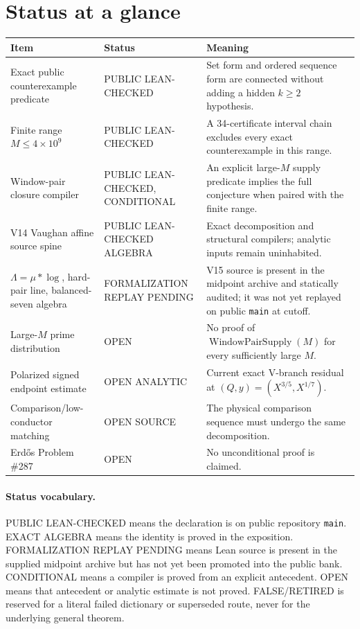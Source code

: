 \documentclass[11pt]{article}
\theoremstyle{definition}
\newcommand{\1}{\mathbf 1}
\newcommand{\WPS}{\operatorname{WindowPairSupply}}
\newcommand{\status}[1]{\textsf{#1}}
\begin{document}
\section*{Status at a glance}
\begin{center}
\renewcommand{\arraystretch}{1.22}
\begin{tabularx}{\textwidth}{>{\raggedright\arraybackslash}p{}
>{\raggedright\arraybackslash}p{}X}
\toprule
Item & Status & Meaning \\
\midrule
Exact public counterexample predicate & \status{PUBLIC LEAN-CHECKED} & Set form and ordered sequence form are connected without adding a hidden $k\ge2$ hypothesis. \\
Finite range $M\le4\times10^9$ & \status{PUBLIC LEAN-CHECKED} & A 34-certificate interval chain excludes every exact counterexample in this range. \\
Window-pair closure compiler & \status{PUBLIC LEAN-CHECKED, CONDITIONAL} & An explicit large-$M$ supply predicate implies the full conjecture when paired with the finite range. \\
V14 Vaughan affine source spine & \status{PUBLIC LEAN-CHECKED ALGEBRA} & Exact decomposition and structural compilers; analytic inputs remain uninhabited. \\
$\Lambda=\mu*\log$, hard-pair line, balanced-seven algebra & \status{FORMALIZATION REPLAY PENDING} & V15 source is present in the midpoint archive and statically audited; it was not yet replayed on public \texttt{main} at cutoff. \\
Large-$M$ prime distribution & \status{OPEN} & No proof of $\WPS(M)$ for every sufficiently large $M$. \\
Polarized signed endpoint estimate & \status{OPEN ANALYTIC} & Current exact V-branch residual at $(Q,y)=(X^{3/5},X^{1/7})$. \\
Comparison/low-conductor matching & \status{OPEN SOURCE} & The physical comparison sequence must undergo the same decomposition. \\
Erd\H{o}s Problem \#287 & \status{OPEN} & No unconditional proof is claimed. \\
\bottomrule
\end{tabularx}
\end{center}

\paragraph{Status vocabulary.}
\status{PUBLIC LEAN-CHECKED} means the declaration is on public repository
\texttt{main}.  \status{EXACT ALGEBRA} means the identity is proved in the exposition.
\status{FORMALIZATION REPLAY PENDING} means Lean source is present in the supplied midpoint
archive but has not yet been promoted into the public bank.  \status{CONDITIONAL} means a
compiler is proved from an explicit antecedent.  \status{OPEN} means that antecedent or
analytic estimate is not proved.  \status{FALSE/RETIRED} is reserved for a literal failed
dictionary or superseded route, never for the underlying general theorem.
\end{document}
